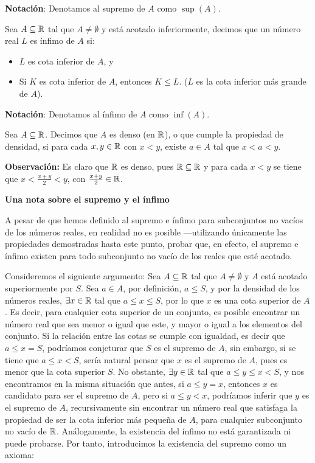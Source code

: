 \textbf{Notación}: Denotamos al supremo de $A$ como $\sup(A)$.

 Sea $A\subseteq \mathbb{R}$ tal que $A\neq \emptyset$ y está acotado inferiormente, decimos que un número real $L$ es ínfimo de $A$ si: \begin{itemize}
 \item $L$ es cota inferior de $A$, y
 \item Si $K$ es cota inferior de $A$, entonces $K\leq L$. ($L$ es la cota inferior más grande de $A$).
\end{itemize}

\textbf{Notación}: Denotamos al ínfimo de $A$ como $\inf(A)$.

 Sea $A\subseteq \mathbb{R}$. Decimos que $A$ es denso (en $\mathbb{R}$), o que cumple la propiedad de densidad, si para cada $x,y \in \mathbb{R}$ con $x<y$, existe $a\in A$ tal que $x<a<y$.

\textbf{Observación:} Es claro que $\mathbb{R}$ es denso, pues $\mathbb{R}\subseteq \mathbb{R}$ y para cada $x<y$ se tiene que $x<\frac{x+y}{2}<y$, con $\frac{x+y}{2}\in \mathbb{R}$.

\textbf{Una nota sobre el supremo y el ínfimo}

A pesar de que hemos definido al supremo e ínfimo para subconjuntos no vacíos de los números reales, en realidad no es posible ---utilizando únicamente las propiedades demostradas hasta este punto, probar que, en efecto, el supremo e ínfimo existen para todo subconjunto no vacío de los reales que esté acotado.

Consideremos el siguiente argumento: Sea $A\subseteq \mathbb{R}$ tal que $A\neq \emptyset$ y $A$ está acotado superiormente por $S$. Sea $a\in A$, por definición, $a\leq S$, y por la densidad de los números reales, $\exists x\in \mathbb{R}$ tal que $a\leq x \leq S$, por lo que $x$ es una cota superior de $A$. Es decir, para cualquier cota superior de un conjunto, es posible encontrar un número real que sea menor o igual que este, y mayor o igual a los elementos del conjunto. Si la relación entre las cotas se cumple con igualdad, es decir que $a\leq x = S$, podríamos conjeturar que $S$ es el supremo de $A$, sin embargo, si se tiene que $a\leq x < S$, sería natural pensar que $x$ es el supremo de $A$, pues es menor que la cota superior $S$. No obstante, $\exists y\in \mathbb{R}$ tal que $a\leq y \leq x<S$, y nos encontramos en la misma situación que antes, si $a\leq y = x$, entonces $x$ es candidato para ser el supremo de $A$, pero si $a\leq y < x$, podríamos inferir que $y$ es el supremo de $A$, recursivamente sin encontrar un número real que satisfaga la propiedad de ser la cota inferior más pequeña de $A$, para cualquier subconjunto no vacío de $\mathbb{R}$. Análogamente, la existencia del ínfimo no está garantizada ni puede probarse. Por tanto, introducimos la existencia del supremo como un axioma:

